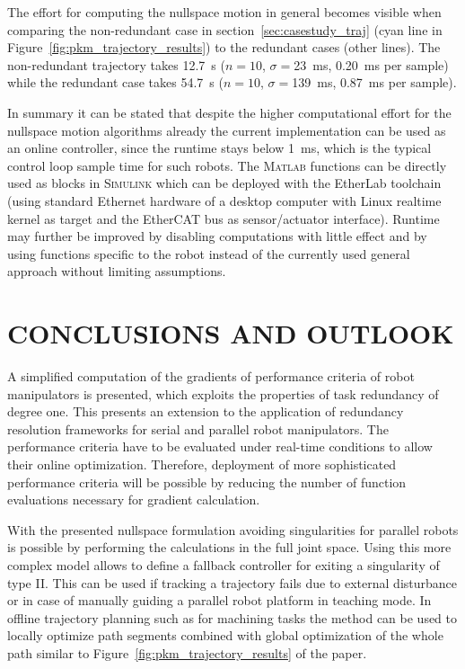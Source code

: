 \documentclass[a4paper,twoside]{article}
\begin{document}
The effort for computing the nullspace motion in general becomes visible when comparing the non-redundant case in section~\ref{sec:casestudy_traj} (cyan line in Figure~\ref{fig:pkm_trajectory_results}) to the redundant cases (other lines).
The non-redundant trajectory takes \SI{12.7}{\second} ($n{=}10$, $\sigma{=}$\SI{23}{\milli\second}, \SI{0.20}{\milli\second} per sample) while the redundant case takes \SI{54.7}{\second} ($n{=}10$, $\sigma{=}$\SI{139}{\milli\second}, \SI{0.87}{\milli\second} per sample).

In summary it can be stated that despite the higher computational effort for the nullspace motion algorithms already the current implementation can be used as an online controller, since the runtime stays below \SI{1}{\milli\second}, which is the typical control loop sample time for such robots.
The \textsc{Matlab} functions can be directly used as blocks in \textsc{Simulink} which can be deployed with the EtherLab toolchain (using standard Ethernet hardware of a desktop computer with Linux realtime kernel as target and the EtherCAT bus as sensor/actuator interface).
Runtime may further be improved by disabling computations with little effect and by using functions specific to the robot instead of the currently used general approach without limiting assumptions.


\section{\uppercase{Conclusions and Outlook}}
\label{sec:conclusion}

A simplified computation of the gradients of performance criteria of robot manipulators is presented, which exploits the properties of task redundancy of degree one.
This presents an extension to the application of redundancy resolution frameworks for serial and parallel robot manipulators.
The performance criteria have to be evaluated under real-time conditions to allow their online optimization.
Therefore, deployment of more sophisticated performance criteria will be possible by reducing the number of function evaluations necessary for gradient calculation.

With the presented nullspace formulation avoiding singularities for parallel robots is possible by performing the calculations in the full joint space.
Using this more complex model allows to define a fallback controller for exiting a singularity of type II.
This can be used if tracking a trajectory fails due to external disturbance or in case of manually guiding a parallel robot platform in teaching mode.
In offline trajectory planning such as for machining tasks the method can be used to locally optimize path segments combined with global optimization of the whole path similar to Figure~\ref{fig:pkm_trajectory_results} of the paper.
\end{document}
